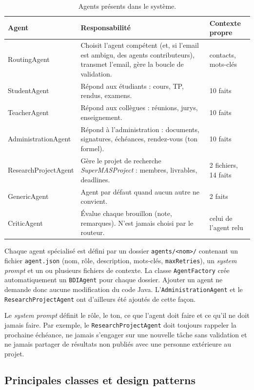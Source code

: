 \documentclass[11pt,a4paper]{article}
\newcommand{\code}[1]{\texttt{#1}}
\begin{document}
\begin{table}[H]
\centering
\small
\begin{tabularx}{\linewidth}{l L l}
\toprule
\textbf{Agent} & \textbf{Responsabilité} & \textbf{Contexte propre} \\
\midrule
RoutingAgent & Choisit l'agent compétent (et, si l'email est ambigu, des agents contributeurs), transmet l'email, gère la boucle de validation. & contacts, mots-clés \\
StudentAgent & Répond aux étudiants : cours, TP, rendus, examens. & 10 faits \\
TeacherAgent & Répond aux collègues : réunions, jurys, enseignement. & 10 faits \\
AdministrationAgent & Répond à l'administration : documents, signatures, échéances, rendez-vous (ton formel). & 10 faits \\
ResearchProjectAgent & Gère le projet de recherche \emph{SuperMASProject} : membres, livrables, deadlines. & 2 fichiers, 14 faits \\
GenericAgent & Agent par défaut quand aucun autre ne convient. & 2 faits \\
CriticAgent & Évalue chaque brouillon (note, remarques). N'est jamais choisi par le routeur. & celui de l'agent relu \\
\bottomrule
\end{tabularx}
\caption{Agents présents dans le système.}
\end{table}

Chaque agent spécialisé est défini par un dossier \code{agents/<nom>/} contenant un fichier
\code{agent.json} (nom, rôle, description, mots-clés, \code{maxRetries}), un
\emph{system prompt} et un ou plusieurs fichiers de contexte. La classe \code{AgentFactory}
crée automatiquement un \code{BDIAgent} pour chaque dossier. Ajouter un agent ne demande
donc aucune modification du code Java. L'\code{AdministrationAgent} et le
\code{ResearchProjectAgent} ont d'ailleurs été ajoutés de cette façon.

Le \emph{system prompt} définit le rôle, le ton, ce que l'agent doit faire et ce qu'il ne
doit jamais faire. Par exemple, le \code{ResearchProjectAgent} doit toujours rappeler la
prochaine échéance, ne jamais s'engager sur une nouvelle tâche sans validation et ne
jamais partager de résultats non publiés avec une personne extérieure au projet.

\subsection{Principales classes et design patterns}
\end{document}

